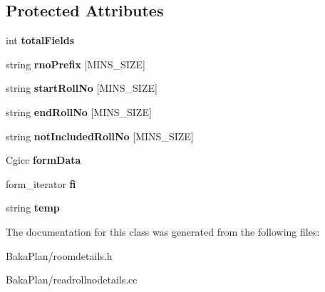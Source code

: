 \subsection*{Protected Attributes}
\begin{DoxyCompactItemize}
\item 
\hypertarget{classReadRollNoDetails_a9e3da16b31935dc91fec7c5c9fe5b0b1}{int {\bfseries total\-Fields}}\label{classReadRollNoDetails_a9e3da16b31935dc91fec7c5c9fe5b0b1}

\item 
\hypertarget{classReadRollNoDetails_a3ce491bf8fbdc887b3fc2c1d9bab03f6}{string {\bfseries rno\-Prefix} \mbox{[}M\-I\-N\-S\-\_\-\-S\-I\-Z\-E\mbox{]}}\label{classReadRollNoDetails_a3ce491bf8fbdc887b3fc2c1d9bab03f6}

\item 
\hypertarget{classReadRollNoDetails_a40301d363dead62c878a501f6cc13f3c}{string {\bfseries start\-Roll\-No} \mbox{[}M\-I\-N\-S\-\_\-\-S\-I\-Z\-E\mbox{]}}\label{classReadRollNoDetails_a40301d363dead62c878a501f6cc13f3c}

\item 
\hypertarget{classReadRollNoDetails_a165f0453148ac33fc3d42a0749c1e3d2}{string {\bfseries end\-Roll\-No} \mbox{[}M\-I\-N\-S\-\_\-\-S\-I\-Z\-E\mbox{]}}\label{classReadRollNoDetails_a165f0453148ac33fc3d42a0749c1e3d2}

\item 
\hypertarget{classReadRollNoDetails_add8c46be1edcce9f5d03d0a738d90682}{string {\bfseries not\-Included\-Roll\-No} \mbox{[}M\-I\-N\-S\-\_\-\-S\-I\-Z\-E\mbox{]}}\label{classReadRollNoDetails_add8c46be1edcce9f5d03d0a738d90682}

\item 
\hypertarget{classReadRollNoDetails_ac821611109cf5b331fa827c6c0814176}{Cgicc {\bfseries form\-Data}}\label{classReadRollNoDetails_ac821611109cf5b331fa827c6c0814176}

\item 
\hypertarget{classReadRollNoDetails_a993462dcd9f13d5ab4d0ac41ce58c2c0}{form\-\_\-iterator {\bfseries fi}}\label{classReadRollNoDetails_a993462dcd9f13d5ab4d0ac41ce58c2c0}

\item 
\hypertarget{classReadRollNoDetails_ad362d259f2383fa1c0ee6aef9399b613}{string {\bfseries temp}}\label{classReadRollNoDetails_ad362d259f2383fa1c0ee6aef9399b613}

\end{DoxyCompactItemize}


The documentation for this class was generated from the following files\-:\begin{DoxyCompactItemize}
\item 
Baka\-Plan/roomdetails.\-h\item 
Baka\-Plan/readrollnodetails.\-cc\end{DoxyCompactItemize}
